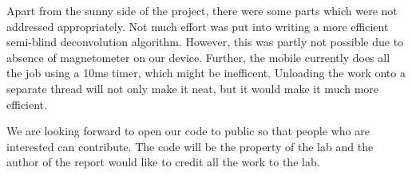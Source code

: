 \documentclass[BTech]{iitmdiss}
\begin{document}
Apart from the sunny side of the project, there were some parts which 
were not addressed appropriately. Not much effort was put into writing 
a more efficient semi-blind deconvolution algorithm. However, this was
partly not possible due to absence of magnetometer on our device. Further,
the mobile currently does all the job using a 10ms timer, which might
be inefficent. Unloading the work onto a separate thread will not only
make it neat, but it would make it much more efficient. 

We are looking forward to open our code to public so that people who are
interested can contribute. The code will be the property of the lab and 
the author of the report would like to credit all the work to the lab.
\pagebreak


\begin{singlespacing}
	
	\nocite{*}
	
\end{singlespacing}
\end{document}
